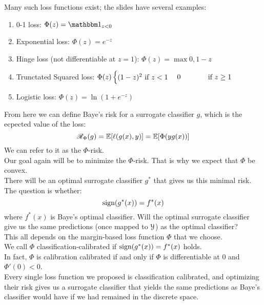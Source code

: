 \documentclass[12pt]{article}
\begin{document}
Many such loss functions exist;
the slides have several examples:
\begin{enumerate}
    \item 
    0-1 loss: $\Phi(z) = \indicator_{z<0}$
    \item
    Exponential loss: $\Phi(z) = e^{-z}$
    \item
    Hinge loss
    (not differentiable at $z = 1$):
    $\Phi(z) = \max{0, 1-z}$
    \item
    Trunctated Squared loss:
    $\Phi(z) \begin{cases} (1-z)^2 \text{ if } z < 1 \end{cases}
    {0 \hspace{35pt} \text{ if }z \geq 1}$
    \item 
    Logistic loss:
    $\Phi(z) = \ln(1 + e^{-z})$ \\
\end{enumerate}

From here we can define Baye's risk for a
surrogate classifier $g$,
which is the ecpected value of the loss:
\[ \mathscr{R}_\Phi(g) = \mathbb{E}[\ell(g(x), y)]
= \mathbb{E}[\Phi(yg(x))] \]
We can refer to it as the $\Phi$-risk. \\

Our goal again will be to minimize the
$\Phi$-risk.
That is why we expect that $\Phi$ be convex. \\
There will be an optimal surrogate classifier
$g^*$ that gives us this minimal risk. \\
The question is whether:
\[ \text{sign}(g^*(x)) = f^*(x) \]
where $f^*(x)$ is Baye's optimal classifier.
Will the optimal surrogate classifier give
us the same predictions
(once mapped to $\mathcal{Y}$) as the optimal
classifier? \\

This all depends on the margin-based 
loss function $\Phi$ that we choose. \\
We call $\Phi$ classification-calibrated
if $\text{sign}(g^*(x)) = f^*(x)$ holds. \\

In fact, $\Phi$ is calibration calibrated
if and only if $\Phi$ is differentiable at $0$
and $\Phi'(0) < 0$. \\
Every single loss function we proposed
is classification calibrated,
and optimizing their risk gives us a surrogate
classifier that yields the same predictions
as Baye's classifier would have
if we had remained in the discrete space. \\
\end{document}
